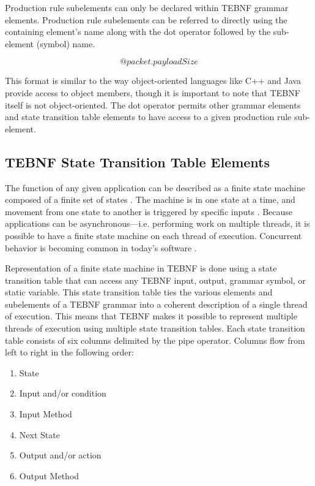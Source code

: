 \indent
Production rule subelements can only be declared within TEBNF grammar elements.  Production rule subelements can be referred to directly using the containing element’s name along with the dot operator followed by the sub-element (symbol) name.

\begin{equation}
@packet.payloadSize
\label{ExampleDotOperator}
\end{equation}

\indent
This format is similar to the way object-oriented languages like C++ and Java provide access to object members, though it is important to note that TEBNF itself is not object-oriented.  The dot operator permits other grammar elements and state transition table elements to have access to a given production rule sub-element.

\subsection{TEBNF State Transition Table Elements}
The function of any given application can be described as a finite state machine composed of a finite set of states \cite{lee_01}.  The machine is in one state at a time, and movement from one state to another is triggered by specific inputs \cite{lee_01}. Because applications can be asynchronous—i.e. performing work on multiple threads, it is possible to have a finite state machine on each thread of execution.  Concurrent behavior is becoming common in today’s software \cite{kahlon_01}.

\indent
Representation of a finite state machine in TEBNF is done using a state transition table that can access any TEBNF input, output, grammar symbol, or static variable.  This state transition table ties the various elements and subelements of a TEBNF grammar into a coherent description of a single thread of execution.  This means that TEBNF makes it possible to represent multiple threads of execution using multiple state transition tables.  Each state transition table consists of six columns delimited by the pipe operator.  Columns flow from left to right in the following order:
\begin{enumerate}
 \item State
 \item Input and/or condition
 \item Input Method
 \item Next State
 \item Output and/or action
 \item Output Method
\end{enumerate}

